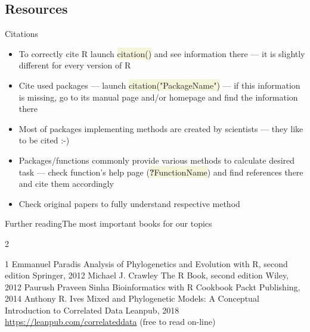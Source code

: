 \documentclass[compress, xelatex, 11pt, xcolor=svgnames, aspectratio=169, url={hyphens, lowtilde}]{beamer}
\renewcommand{\texttt}[1]{\colorbox{Beige}{{\ttfamily #1}}}
\begin{document}
\subsection{Resources}

\begin{frame}{Citations}
	\begin{itemize}
		\item To correctly cite R launch \texttt{citation()} and see information there --- it is slightly different for every version of R
		\item Cite used packages --- launch \texttt{citation("PackageName")} --- if this information is missing, go to its manual page and/or homepage and find the information there
		\item Most of packages implementing methods are created by scientists --- they like to be cited :-)
		\item Packages/functions commonly provide various methods to calculate desired task --- check function's help page (\texttt{\textbf{?}FunctionName}) and find references there and cite them accordingly
		\item Check original papers to fully understand respective method
	\end{itemize}
\end{frame}

\begin{frame}{Further reading}{The most important books for our topics}
	\begin{multicols}{2}
		\begin{thebibliography}{1}
				Emmanuel Paradis
				\newblock Analysis of Phylogenetics and Evolution with R, second edition
				\newblock Springer, 2012
				Michael J. Crawley
				\newblock The R Book, second edition
				\newblock Wiley, 2012
				Paurush Praveen Sinha
				\newblock Bioinformatics with R Cookbook
				\newblock Packt Publishing, 2014
				Anthony R. Ives
				\newblock Mixed and Phylogenetic Models: A Conceptual Introduction to Correlated Data
				\newblock Leanpub, 2018
				\newblock \url{https://leanpub.com/correlateddata} (free to read on-line)
		\end{thebibliography}
	\end{multicols}
\end{frame}
\end{document}
